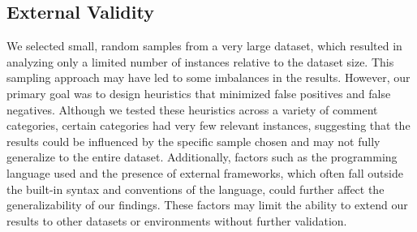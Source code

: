 \subsection{External Validity}
We selected small, random samples from a very large dataset, which resulted in analyzing only a limited number of instances relative to the dataset size. This sampling approach may have led to some imbalances in the results. However, our primary goal was to design heuristics that minimized false positives and false negatives. Although we tested these heuristics across a variety of comment categories, certain categories had very few relevant instances, suggesting that the results could be influenced by the specific sample chosen and may not fully generalize to the entire dataset.
Additionally, factors such as the programming language used and the presence of external frameworks, which often fall outside the built-in syntax and conventions of the language, could further affect the generalizability of our findings. These factors may limit the ability to extend our results to other datasets or environments without further validation.